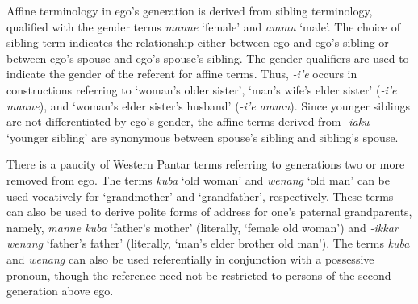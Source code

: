 Affine terminology in ego's generation is derived from sibling terminology, qualified with the gender terms \textit{manne} `female' and \textit{ammu} `male'. The choice of sibling term indicates the relationship either between ego and ego's sibling or between ego's spouse and ego's spouse's sibling. The gender qualifiers are used to indicate the gender of the referent for affine terms. Thus, \textit{-i'e} occurs in constructions referring to `woman's older sister', `man's wife's elder sister' (\textit{-i'e manne}), and `woman's elder sister's husband' (\textit{-i'e ammu}). Since younger siblings are not differentiated by ego's gender, the affine terms derived from \textit{-iaku} `younger sibling' are synonymous between spouse's sibling and sibling's spouse.

There is a paucity of Western Pantar terms referring to generations two or more removed from ego. The terms \textit{kuba} `old woman' and \textit{wenang} `old man' can be used vocatively for `grandmother' and `grandfather', respectively. These terms can also be used to derive polite forms of address for one's paternal grandparents, namely, \textit{manne kuba} `father's mother' (literally, `female old woman') and \textit{-ikkar wenang} `father's father' (literally, `man's elder brother old man'). The terms \textit{kuba} and \textit{wenang} can also be used referentially in conjunction with a possessive pronoun, though the reference need not be restricted to persons of the second generation above ego.




